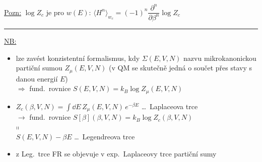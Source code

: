 \underline{Pozn:} $\log Z_c$ je  pro $w(E)$: \quad
$\langle H^n\rangle_{w_c} = (-1)^n\dfrac{\partial^n}{\partial\beta^n}\log Z_c$

\noindent\rule{\linewidth}{0.4pt}

\underline{NB:}
\begin{itemize}
  \item lze zavést konzistentní formalismus, kdy $\Sigma(E,V,N)$ nazvu mikrokanonickou partiční sumou $Z_\mu(E,V,N)$ (v QM se skutečně jedná o součet přes stavy s danou energií $E$) \\
        $\Rightarrow$ fund.\ rovnice \quad $S(E,V,N) = k_B\log Z_\mu(E,V,N)$
  \item $Z_c(\beta,V,N) = \int\dd E\,Z_\mu(E,V,N)\,e^{-\beta E}$ \quad \dots\ Laplaceova trce \\
        $\to$ fund.\ rovnice \quad $S[\beta](\beta,V,N) = k_B\log Z_c(\beta,V,N)$ \\
        \hspace*{4.3cm}$\shortparallel$ \\
        \hspace*{3.3cm}$S(E,V,N) - \beta E$ \quad \dots\ Legendreova trce
  \item {} z Leg.\ trce FR se objevuje v exp.\ Laplaceovy trce partiční sumy
\end{itemize}

